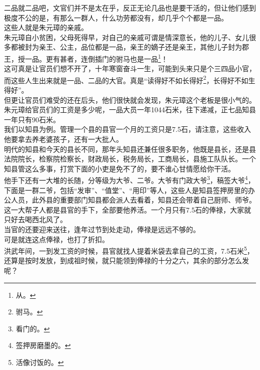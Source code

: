 \begin{multicols}{\theparacolNo}
二品就二品吧，文官们并不是太在乎，反正无论几品也是要干活的，但让他们感到极度不公的是，有那么一群人，什么功劳都没有，却几乎个个都是一品。\\

这些人就是朱元璋的亲戚。\\

朱元璋自小贫困，父母死得早，对自己的亲戚可谓是情深意长，他的儿子、女儿很多都被封为亲王、公主，品位都是一品，亲王的嫡子还是亲王，其他儿子封为郡王，授一品。更有甚者，连倒插门的驸马也是一品\footnote{从。}！\\

这可真是让官员们想不开了，十年寒窗奋斗一生，可能到头来只是个三四品小官，而这些人生出来就是一品、二品的大官。真是“读得好不如长得好\footnote{驸马。}，长得好不如生得好”。\\

但更让官员们难受的还在后头，他们很快就会发现，朱元璋这个老板是很小气的。\\

朱元璋给官员们的工资是多少呢，一品大员一年1044石米，往下递减，正七品知县一年只有90石米。\\

我们以知县为例。管理一个县的县官一个月的工资只是7.5石，请注意，这些收入他要拿去养老婆孩子，还有一大批人。\\

明代的知县和今天的县长不同，那年头知县还兼任很多职务，他既是县长，还是县法院院长，检察院检察长，财政局长，税务局长，工商局长，县施工队队长。一个知县管这么多事，打赏下面的小吏是免不了的，要不谁心甘情愿给你干活。\\

他手下还有一大堆的长随，分等级为大爷、二爷。大爷有门政大爷\footnote{看门的。}，稿签大爷\footnote{签押房磨墨的。}，下面是一群二爷，包括“发审”、“值堂”、“用印”等人，这些人是知县签押房里的办公人员，此外县的重要部门知县都会派人去看着，知县还会带着自己厨师、师爷。\\

这一大帮子人都是县官的手下，全部要他养活。一个月只有7.5石的俸禄，大家就只好去喝西北风了。\\

当官的还要迎来送往，逢年过节到处走动，俸禄是远远不够的。\\

可是就连这点俸禄，也打了折扣。\\

洪武年间，一到发工资的时候，县官就找人提着米袋去拿自己的工资，7.5石米\footnote{活像讨饭的。}，还算是按时发放，到成祖时候，就只能领到俸禄的十分之六，其余的部分怎么发呢？\\


\end{multicols}
